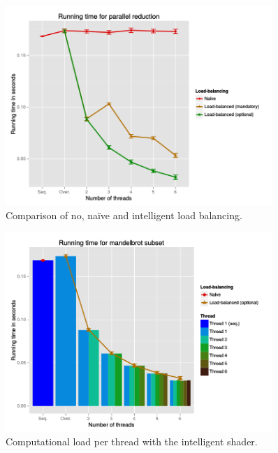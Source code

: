 \documentclass[a4paper,12pt]{article}
\begin{document}
\begin{figure}[h]
  \centering
  \includegraphics[width=0.9\textwidth]{1_timing.png}
  \caption{Comparison of no, naïve and intelligent load balancing.}
\end{figure}

\begin{figure}[h]
  \centering
  \includegraphics[width=0.9\textwidth]{4_timing-load_balance_2.png}
  \caption{Computational load per thread with the intelligent shader.}
\end{figure}
\end{document}
